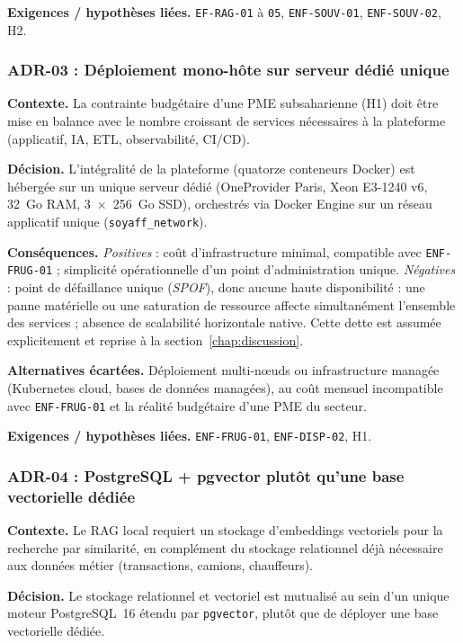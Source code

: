 \textbf{Exigences / hypothèses liées.} \texttt{EF-RAG-01} à \texttt{05}, \texttt{ENF-SOUV-01}, \texttt{ENF-SOUV-02}, H2.

\subsubsection*{ADR-03 : Déploiement mono-hôte sur serveur dédié unique}
\textbf{Contexte.} La contrainte budgétaire d'une PME subsaharienne (H1) doit être mise en balance avec le nombre croissant de services nécessaires à la plateforme (applicatif, IA, ETL, observabilité, CI/CD).

\textbf{Décision.} L'intégralité de la plateforme (quatorze conteneurs Docker) est hébergée sur un unique serveur dédié (OneProvider Paris, Xeon E3-1240 v6, 32~Go RAM, 3~$\times$~256~Go SSD), orchestrés via Docker Engine sur un réseau applicatif unique (\texttt{soyaff\_network}).

\textbf{Conséquences.} \textit{Positives} : coût d'infrastructure minimal, compatible avec \texttt{ENF-FRUG-01} ; simplicité opérationnelle d'un point d'administration unique. \textit{Négatives} : point de défaillance unique (\textit{SPOF}), donc aucune haute disponibilité : une panne matérielle ou une saturation de ressource affecte simultanément l'ensemble des services ; absence de scalabilité horizontale native. Cette dette est assumée explicitement et reprise à la section~\ref{chap:discussion}.

\textbf{Alternatives écartées.} Déploiement multi-nœuds ou infrastructure managée (Kubernetes cloud, bases de données managées), au coût mensuel incompatible avec \texttt{ENF-FRUG-01} et la réalité budgétaire d'une PME du secteur.

\textbf{Exigences / hypothèses liées.} \texttt{ENF-FRUG-01}, \texttt{ENF-DISP-02}, H1.

\subsubsection*{ADR-04 : PostgreSQL + pgvector plutôt qu'une base vectorielle dédiée}
\textbf{Contexte.} Le RAG local requiert un stockage d'embeddings vectoriels pour la recherche par similarité, en complément du stockage relationnel déjà nécessaire aux données métier (transactions, camions, chauffeurs).

\textbf{Décision.} Le stockage relationnel et vectoriel est mutualisé au sein d'un unique moteur PostgreSQL~16 étendu par \texttt{pgvector}, plutôt que de déployer une base vectorielle dédiée.

